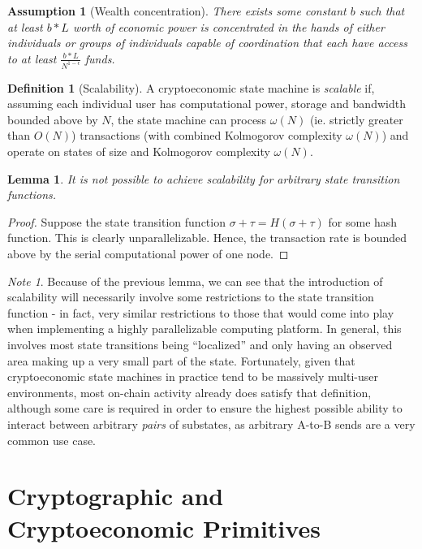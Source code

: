 \documentclass[11pt,a4paper]{report}
\theoremstyle{plain}
\newtheorem{lem}[thm]{Lemma}
\newtheorem{assm}{Assumption}[chapter]
\theoremstyle{definition}
\newtheorem{defn}{Definition}[chapter]
\theoremstyle{remark}
\newtheorem*{note}{Note}
\begin{document}
\begin{assm}[Wealth concentration]
There exists some constant $b$ such that at least $b * L$ worth of economic power is concentrated in the hands of either individuals or groups of individuals capable of coordination that each have access to at least $\frac{b * L}{N^{1-\epsilon}}$ funds.\cite{piketty}
\end{assm}

\begin{defn}[Scalability]
A cryptoeconomic state machine is \emph{scalable} if, assuming each individual user has computational power, storage and bandwidth bounded above by $N$, the state machine can process $\omega(N)$ (ie. strictly greater than $O(N)$) transactions (with combined Kolmogorov complexity $\omega(N)$) and operate on states of size and Kolmogorov complexity $\omega(N)$.
\end{defn}

\begin{lem}
It is not possible to achieve scalability for arbitrary state transition functions.
\end{lem}
\begin{proof}
Suppose the state transition function $\sigma + \tau = H(\sigma + \tau)$ for some hash function. This is clearly unparallelizable. Hence, the transaction rate is bounded above by the serial computational power of one node.
\end{proof}

\begin{note}
Because of the previous lemma, we can see that the introduction of scalability will necessarily involve some restrictions to the state transition function - in fact, very similar restrictions to those that would come into play when implementing a highly parallelizable computing platform. In general, this involves most state transitions being ``localized'' and only having an observed area making up a very small part of the state. Fortunately, given that cryptoeconomic state machines in practice tend to be massively multi-user environments, most on-chain activity already does satisfy that definition, although some care is required in order to ensure the highest possible ability to interact between arbitrary \emph{pairs} of substates, as arbitrary A-to-B sends are a very common use case.
\end{note}


\chapter{Cryptographic and Cryptoeconomic Primitives}
\end{document}
